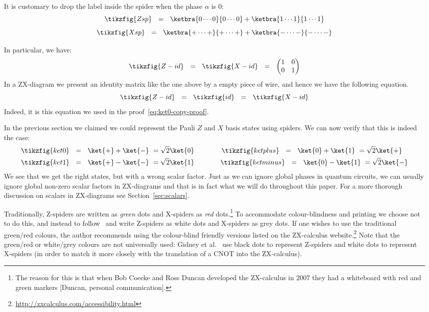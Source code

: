 \documentclass[a4paper,onecolumn,superscriptaddress,11pt,%
				unpublished,%
				allowfontchageintitle,%
				]{quantumarticle}
\begin{document}
It is customary to drop the label inside the spider when the phase $\alpha$ is $0$:
\[\hfill \tikzfig{Zsp} \ \ =\ \ \ketbra{0 \cdots 0}{0 \cdots 0} + \ketbra{1 \cdots 1}{1 \cdots 1} \hfill\]
\[\hfill \tikzfig{Xsp} \ \ =\ \ \ketbra{+ \cdots +}{+ \cdots +} + \ketbra{- \cdots -}{- \cdots -} \hfill\]

In particular, we have:
\begin{equation}
\tikzfig{Z-id}\ \ = \ \ \tikzfig{X-id} \ \ = \ \ \begin{pmatrix}1&0\\0&1\end{pmatrix}
\end{equation}
In a ZX-diagram we present an identity matrix like the one above by a empty piece of wire, and hence we have the following equation.
\[\tikzfig{Z-id}\ \ = \ \ \tikzfig{id} \ \ = \ \ \tikzfig{X-id}\]
Indeed, it is this equation we used in the proof~\eqref{eq:ket0-copy-proof}.

In the previous section we claimed we could represent the Pauli $Z$ and $X$ basis states using spiders. We can now verify that this is indeed the case:
\begin{align}\label{eq:kets}
\tikzfig{ket0}\ \ &=\ \ \ket{+} + \ket{-} \ = \sqrt{2}\ket{0}
\qquad\qquad
\tikzfig{ketplus}\ \ =\ \ \ket{0} + \ket{1} \ = \sqrt{2}\ket{+} \\
\tikzfig{ket1}\ \ &=\ \ \ket{+} - \ket{-} \ = \sqrt{2}\ket{1}
\qquad\qquad\!
\tikzfig{ketminus}\ \ =\ \ \ket{0} - \ket{1} \ = \sqrt{2}\ket{-}
\end{align}
We see that we get the right states, but with a wrong scalar factor. Just as we can ignore global phases in quantum circuits, we can usually ignore global non-zero scalar factors in ZX-diagrams and that is in fact what we will do throughout this paper. For a more thorough discussion on scalars in ZX-diagrams see Section~\ref{sec:scalars}.

Traditionally, Z-spiders are written as \emph{green} dots and X-spiders as \emph{red} dots.\footnote{The reason for this is that when Bob Coecke and Ross Duncan developed the ZX-calculus in 2007 they had a whiteboard with red and green markers [Duncan, personal communication].} To accommodate colour-blindness and printing we choose not to do this, and instead to follow~\cite{CKbook} and write Z-spiders as white dots and X-spiders as grey dots.
If one wishes to use the traditional green/red colours, the author recommends using the colour-blind friendly versions listed on the ZX-calculus website.\footnote{\url{http://zxcalculus.com/accessibility.html}} 
Note that the green/red or white/grey colours are not universally used: Gidney et al.~\cite{Gidney2019efficientmagicstate} use black dots to represent Z-spiders and white dots to represent X-spiders (in order to match it more closely with the translation of a CNOT into the ZX-calculus).
\end{document}

